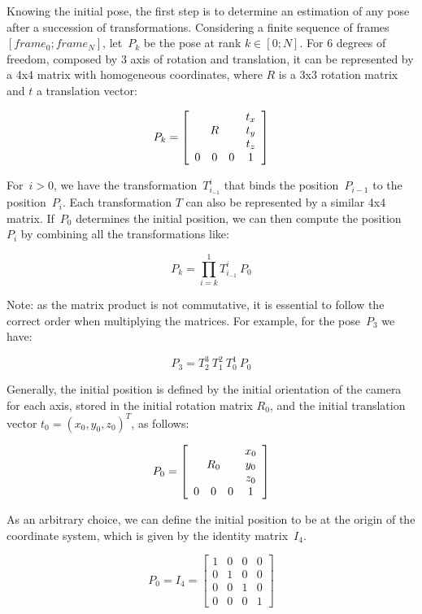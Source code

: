 Knowing the initial pose, the first step is to determine an estimation of any pose after a succession of transformations. Considering a finite sequence of frames $[frame_0 ; frame_N]$, let~$P_k$ be the pose at rank $k \in [0;N]$. For 6 degrees of freedom, composed by 3 axis of rotation and translation, it can be represented by a 4x4 matrix with homogeneous coordinates, where $R$ is a 3x3 rotation matrix and $t$ a translation vector:

$$
P_k = \left[ \begin{array}{cccc}
 \multicolumn{3}{c}{\multirow{3}{*}{$R$}} & t_x \\
 & & & t_y \\
 & & & t_z \\
0 & 0 & 0 & 1 \end{array} \right] 
$$

For~$i>0$, we have the transformation~$T_{i_{-1}}^i$ that binds the position~$P_{i-1}$ to the position~$P_i$. Each transformation $T$ can also be represented by a similar 4x4 matrix. If~$P_0$ determines the initial position, we can then compute the position~$P_i$  by combining all the transformations like:

\begin{equation}
P_k = \prod_{i=k}^1{T_{i_{-1}}^i} \: P_0
\label{eqn:pose_estimation}
\end{equation}

Note: as the matrix product is not commutative, it is essential to follow the correct order when multiplying the matrices. For example, for the pose~$P_3$ we have:

\[
P_3 = T_2^3 \: T_1^2 \: T_0^1 \: P_0
\]

Generally, the initial position is defined by the initial orientation of the camera for each axis, stored in the initial rotation matrix $R_0$, and the initial translation vector $t_0 = (x_0, y_0, z_0)^T$, as follows:

\[
P_0 = \left[ \begin{array}{cccc}
 \multicolumn{3}{c}{\multirow{3}{*}{$R_0$}} & x_0 \\
 & & & y_0 \\
 & & & z_0 \\
0 & 0 & 0 & 1 \end{array} \right] 
\]

As an arbitrary choice, we can define the initial position to be at the origin of the coordinate system, which is given by the identity matrix~$I_4$.

\[
P_0 = I_4 = \left[ \begin{array}{cccc}
1 & 0 & 0 & 0 \\
0 & 1 & 0 & 0 \\
0 & 0 & 1 & 0 \\
0 & 0 & 0 & 1 \end{array} \right] 
\]

